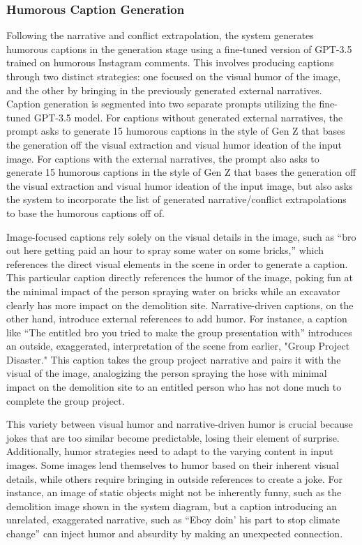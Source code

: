 \subsubsection{Humorous Caption Generation}

Following the narrative and conflict extrapolation, the system generates humorous captions in the generation stage using a fine-tuned version of GPT-3.5 trained on humorous Instagram comments. This involves producing captions through two distinct strategies: one focused on the visual humor of the image, and the other by bringing in the previously generated external narratives. Caption generation is segmented into two separate prompts utilizing the fine-tuned GPT-3.5 model. For captions without generated external narratives, the prompt asks to generate 15 humorous captions in the style of Gen Z that bases the generation off the visual extraction and visual humor ideation of the input image. For captions with the external narratives, the prompt also asks to generate 15 humorous captions in the style of Gen Z that bases the generation off the visual extraction and visual humor ideation of the input image, but also asks the system to incorporate the list of generated narrative/conflict extrapolations to base the humorous captions off of.

Image-focused captions rely solely on the visual details in the image, such as “bro out here getting paid  an hour to spray some water on some bricks,” which references the direct visual elements in the scene in order to generate a caption. This particular caption directly references the humor of the image, poking fun at the minimal impact of the person spraying water on bricks while an excavator clearly has more impact on the demolition site. Narrative-driven captions, on the other hand, introduce external references to add humor. For instance, a caption like “The entitled bro you tried to make the group presentation with” introduces an outside, exaggerated, interpretation of the scene from earlier, "Group Project Disaster." This caption takes the group project narrative and pairs it with the visual of the image, analogizing the person spraying the hose with minimal impact on the demolition site to an entitled person who has not done much to complete the group project. 

This variety between visual humor and narrative-driven humor is crucial because jokes that are too similar become predictable, losing their element of surprise. Additionally, humor strategies need to adapt to the varying content in input images. Some images lend themselves to humor based on their inherent visual details, while others require bringing in outside references to create a joke. For instance, an image of static objects might not be inherently funny, such as the demolition image shown in the system diagram, but a caption introducing an unrelated, exaggerated narrative, such as “Eboy doin' his part to stop climate change” can inject humor and absurdity by making an unexpected connection.

